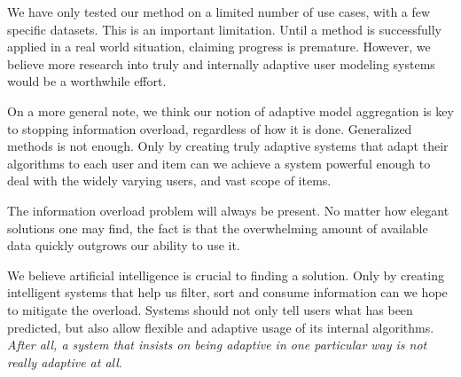 We have only tested our method on a limited 
number of use cases, with a few specific datasets.
This is an important limitation.
Until a method is successfully applied in a real world
situation, claiming progress is premature.
However, we believe more research into 
truly and internally adaptive user modeling systems
would be a worthwhile effort.

On a more general note, we think our notion of adaptive model
aggregation is key to stopping information overload,
regardless of how it is done.
Generalized methods is not enough.
Only by creating truly adaptive systems that adapt their
algorithms to each user and item can we achieve a 
system powerful enough to deal with the widely
varying users, and vast scope of items.

The information overload problem will always be present.
No matter how elegant solutions one may find,
the fact is that the overwhelming amount of available data
quickly outgrows our ability to use it.

We believe artificial intelligence is crucial to finding a solution.
Only by creating intelligent systems that 
help us filter, sort and consume information can we hope 
to mitigate the overload.
Systems should not only tell users what has been predicted,
but also allow flexible and adaptive usage of its internal algorithms.
\emph{After all, a system that insists on being adaptive
in one particular way is not really adaptive at all}.

